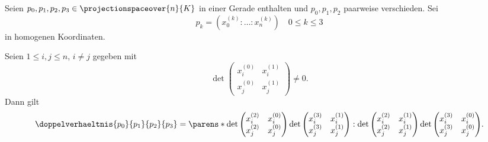 \begin{lemma}
  Seien \( p_0,p_1,p_2,p_3\in \projectionspaceover{n}{K} \) in einer Gerade enthalten und \( p_0,p_1,p_2 \) paarweise verschieden. Sei
  \begin{equation*}
    p_k=(x_0^{(k)}:\dotsc:x_n^{(k)})\quad 0\leq k\leq 3
  \end{equation*}
  in homogenen Koordinaten.

  Seien \( 1\leq i,j\leq n \), \( i\neq j \) gegeben mit
  \begin{equation*}
    \det \begin{pmatrix} x_i^{(0)} & x_i^{(1)} \\ x_j^{(0)} & x_j^{(1)} \end{pmatrix}\neq 0.
  \end{equation*}
  Dann gilt
  \begin{equation*}
    \doppelverhaeltnis{p_0}{p_1}{p_2}{p_3}=\parens*{\det \begin{pmatrix} x_i^{(2)} & x_i^{(0)} \\ x_j^{(2)} & x_j^{(0)} \end{pmatrix}\det \begin{pmatrix} x_i^{(3)} & x_i^{(1)} \\ x_j^{(3)} & x_j^{(1)} \end{pmatrix}:\det \begin{pmatrix} x_i^{(2)} & x_i^{(1)} \\ x_j^{(2)} & x_j^{(1)} \end{pmatrix}\det \begin{pmatrix} x_i^{(3)} & x_i^{(0)} \\ x_j^{(3)} & x_j^{(0)} \end{pmatrix}}.
  \end{equation*}
\end{lemma}